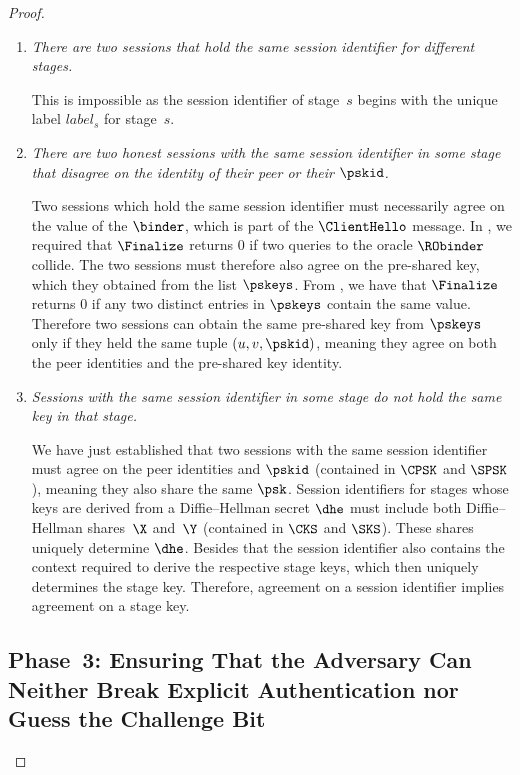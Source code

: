 \begin{proof}
\begin{enumerate}
	\item \textit{There are two sessions that hold the same session identifier for different stages.}
	
	This is impossible as the session identifier of stage~$s$ begins with the unique label $\mathit{label}_s$ for stage~$s$.
	 
	\item \textit{There are two honest sessions with the same session identifier in some stage that disagree on the identity of their peer or their $\pskid$.}
	
	Two sessions which hold the same session identifier must necessarily agree on the value of the $\binder$, which is part of the $\ClientHello$ message.
	In , we required that $\Finalize$ returns $0$ if two queries to the oracle $\RObinder$ collide. 
	The two sessions must therefore also agree on the pre-shared key, which they obtained from the list $\pskeys$.
	From , we have that $\Finalize$ returns $0$ if any two distinct entries in $\pskeys$ contain the same value.
	Therefore two sessions can obtain the same pre-shared key from $\pskeys$ only if they held the same tuple $(u, v, \pskid)$, meaning they agree on both the peer identities and the pre-shared key identity.
	\item \textit{Sessions with the same session identifier in some stage do not hold the same key in that stage.}

	We have just established that two sessions with the same session identifier must agree on the peer identities and $\pskid$ (contained in $\CPSK$ and $\SPSK$), meaning they also share the same $\psk$. 
	Session identifiers for stages whose keys are derived from a Diffie--Hellman secret $\dhe$ must include both Diffie--Hellman shares~$\X$ and~$\Y$ (contained in $\CKS$ and $\SKS$). 
	These shares uniquely determine $\dhe$. 
	Besides that the session identifier also contains the context required to derive the respective stage keys, which then uniquely determines the stage key.
	Therefore, agreement on a session identifier implies agreement on a stage key.
\end{enumerate}

\subsection*{Phase~3: Ensuring That the Adversary Can Neither Break Explicit Authentication nor Guess the Challenge Bit}
	



\end{proof}

